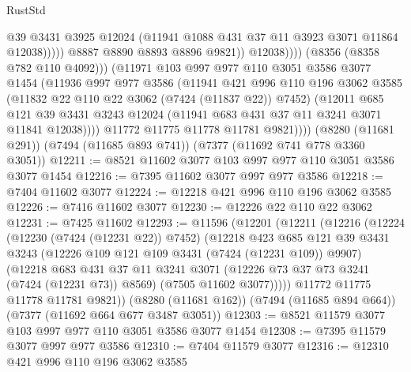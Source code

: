 \begin{lexlean}{RustStd}
\begin{coremodule}
{\begin{coremodule}
{{{{{{{{{{{{{{{{{{{{{{{{{{{{{{{{                                @39
                                @3431
                                @3925
                                @12024
                                (@11941 @1088 @431 @37 @11 @3923 @3071 @11864 @12038)))))
                        @8887
                        @8890
                        @8893
                        @8896
                        @9821))
                    @12038))))
            (@8356 (@8358 @782 @110 @4092)))
          (@11971
            @103
            @997
            @977
            @110
            @3051
            @3586
            @3077
            @1454
            (@11936
              @997
              @977
              @3586
              (@11941
                @421
                @996
                @110
                @196
                @3062
                @3585
                (@11832 @22 @110 @22 @3062 (@7424 (@11837 @22)) @7452)
                (@12011
                  @685
                  @121
                  @39
                  @3431
                  @3243
                  @12024
                  (@11941 @683 @431 @37 @11 @3241 @3071 @11841 @12038))))
            @11772
            @11775
            @11778
            @11781
            @9821))))
    (@8280 (@11681 @291))
    (@7494 (@11685 @893 @741))
    (@7377 (@11692 @741 @778 @3360 @3051))
@12211 := @8521 @11602 @3077 @103 @997 @977 @110 @3051 @3586 @3077 @1454
@12216 := @7395 @11602 @3077 @997 @977 @3586
@12218 := @7404 @11602 @3077
@12224 := @12218 @421 @996 @110 @196 @3062 @3585
@12226 := @7416 @11602 @3077
@12230 := @12226 @22 @110 @22 @3062
@12231 := @7425 @11602
@12293 := @11596
    (@12201
      (@12211
        (@12216
          (@12224
            (@12230 (@7424 (@12231 @22)) @7452)
            (@12218
              @423
              @685
              @121
              @39
              @3431
              @3243
              (@12226 @109 @121 @109 @3431 (@7424 (@12231 @109)) @9907)
              (@12218
                @683
                @431
                @37
                @11
                @3241
                @3071
                (@12226 @73 @37 @73 @3241 (@7424 (@12231 @73)) @8569)
                (@7505 @11602 @3077)))))
        @11772
        @11775
        @11778
        @11781
        @9821))
    (@8280 (@11681 @162))
    (@7494 (@11685 @894 @664))
    (@7377 (@11692 @664 @677 @3487 @3051))
@12303 := @8521 @11579 @3077 @103 @997 @977 @110 @3051 @3586 @3077 @1454
@12308 := @7395 @11579 @3077 @997 @977 @3586
@12310 := @7404 @11579 @3077
@12316 := @12310 @421 @996 @110 @196 @3062 @3585
}}}}}}}}}}}}}}}}}}}}}}}}}}}}}}}}
\end{coremodule}}
\end{coremodule}
\end{lexlean}
